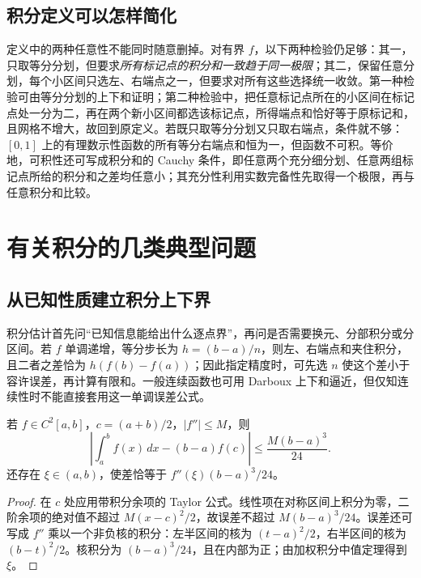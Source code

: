 \subsection{积分定义可以怎样简化}
定义中的两种任意性不能同时随意删掉。对有界 $f$，以下两种检验仍足够：其一，只取等分分划，但要求\emph{所有标记点的积分和一致趋于同一极限}；其二，保留任意分划，每个小区间只选左、右端点之一，但要求对所有这些选择统一收敛。第一种检验可由等分分划的上下和证明；第二种检验中，把任意标记点所在的小区间在标记点处一分为二，再在两个新小区间都选该标记点，所得端点和恰好等于原标记和，且网格不增大，故回到原定义。若既只取等分分划又只取右端点，条件就不够：$[0,1]$ 上的有理数示性函数的所有等分右端点和恒为一，但函数不可积。等价地，可积性还可写成积分和的 Cauchy 条件，即任意两个充分细分划、任意两组标记点所给的积分和之差均任意小；其充分性利用实数完备性先取得一个极限，再与任意积分和比较。

\section{有关积分的几类典型问题}
\label{sec:pei-int-integral-problems}

\subsection{从已知性质建立积分上下界}
积分估计首先问“已知信息能给出什么逐点界”，再问是否需要换元、分部积分或分区间。若 $f$ 单调递增，等分步长为 $h=(b-a)/n$，则左、右端点和夹住积分，且二者之差恰为 $h(f(b)-f(a))$；因此指定精度时，可先选 $n$ 使这个差小于容许误差，再计算有限和。一般连续函数也可用 Darboux 上下和逼近，但仅知连续性时不能直接套用这一单调误差公式。

\begin{proposition}
\label{prop:pei-int-midpoint-bound}
若 $f\in C^2[a,b]$，$c=(a+b)/2$，$|f''|\le M$，则
\[
 \left|\int_a^bf(x)\,dx-(b-a)f(c)\right|\le\frac{M(b-a)^3}{24}.
\]
还存在 $\xi\in(a,b)$，使差恰等于 $f''(\xi)(b-a)^3/24$。
\end{proposition}
\begin{proof}
在 $c$ 处应用带积分余项的 Taylor 公式。线性项在对称区间上积分为零，二阶余项的绝对值不超过 $M(x-c)^2/2$，故误差不超过 $M(b-a)^3/24$。误差还可写成 $f''$ 乘以一个非负核的积分：左半区间的核为 $(t-a)^2/2$，右半区间的核为 $(b-t)^2/2$。核积分为 $(b-a)^3/24$，且在内部为正；由加权积分中值定理得到 $\xi$。
\end{proof}

